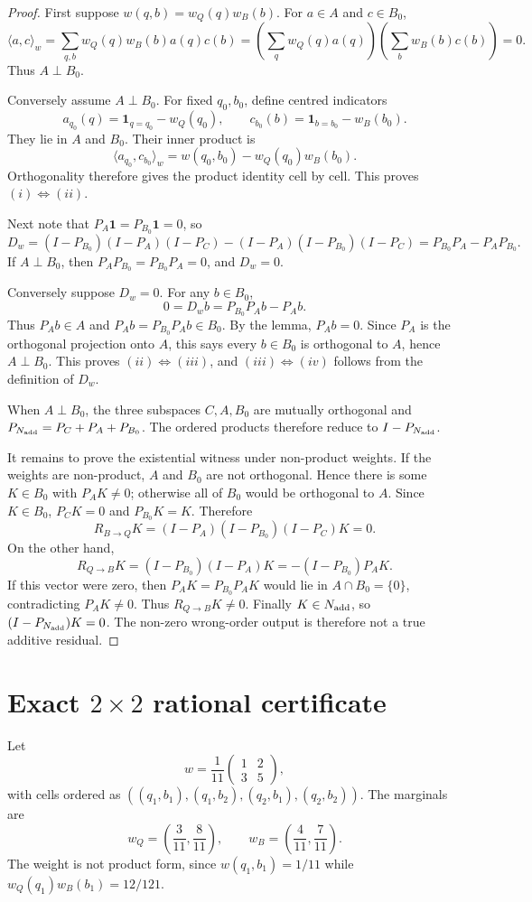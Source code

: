 \documentclass[11pt]{article}
\theoremstyle{remark}
\newcommand{\one}{\mathbf{1}}
\newcommand{\ip}[2]{\langle #1,#2\rangle_w}
\newcommand{\RQBt}{R_{Q\to B}}
\newcommand{\RBQt}{R_{B\to Q}}
\begin{document}
\begin{proof}
First suppose $w(q,b)=w_Q(q)w_B(b)$. For $a\in A$ and $c\in B_0$,
\[
\ip{a}{c}=\sum_{q,b}w_Q(q)w_B(b)a(q)c(b)
=\left(\sum_q w_Q(q)a(q)\right)
\left(\sum_b w_B(b)c(b)\right)=0.
\]
Thus $A\perp B_0$.

Conversely assume $A\perp B_0$. For fixed $q_0,b_0$, define centred indicators
\[
a_{q_0}(q)=\mathbf{1}_{q=q_0}-w_Q(q_0),\qquad
c_{b_0}(b)=\mathbf{1}_{b=b_0}-w_B(b_0).
\]
They lie in $A$ and $B_0$. Their inner product is
\[
\ip{a_{q_0}}{c_{b_0}}
=w(q_0,b_0)-w_Q(q_0)w_B(b_0).
\]
Orthogonality therefore gives the product identity cell by cell. This proves $(i)\Leftrightarrow(ii)$.

Next note that $P_A\one=P_{B_0}\one=0$, so
\[
D_w=(I-P_{B_0})(I-P_A)(I-P_C)-(I-P_A)(I-P_{B_0})(I-P_C)
=P_{B_0}P_A-P_AP_{B_0}.
\]
If $A\perp B_0$, then $P_AP_{B_0}=P_{B_0}P_A=0$, and $D_w=0$.

Conversely suppose $D_w=0$. For any $b\in B_0$,
\[
0=D_wb=P_{B_0}P_Ab-P_Ab.
\]
Thus $P_Ab\in A$ and $P_Ab=P_{B_0}P_Ab\in B_0$. By the lemma, $P_Ab=0$. Since $P_A$ is the orthogonal projection onto $A$, this says every $b\in B_0$ is orthogonal to $A$, hence $A\perp B_0$. This proves $(ii)\Leftrightarrow(iii)$, and $(iii)\Leftrightarrow(iv)$ follows from the definition of $D_w$.

When $A\perp B_0$, the three subspaces $C,A,B_0$ are mutually orthogonal and $P_{N_{\rm add}}=P_C+P_A+P_{B_0}$. The ordered products therefore reduce to $I-P_{N_{\rm add}}$.

It remains to prove the existential witness under non-product weights. If the weights are non-product, $A$ and $B_0$ are not orthogonal. Hence there is some $K\in B_0$ with $P_AK\ne0$; otherwise all of $B_0$ would be orthogonal to $A$. Since $K\in B_0$, $P_CK=0$ and $P_{B_0}K=K$. Therefore
\[
\RBQt K=(I-P_A)(I-P_{B_0})(I-P_C)K=0.
\]
On the other hand,
\[
\RQBt K=(I-P_{B_0})(I-P_A)K=-(I-P_{B_0})P_AK.
\]
If this vector were zero, then $P_AK=P_{B_0}P_AK$ would lie in $A\cap B_0=\{0\}$, contradicting $P_AK\ne0$. Thus $\RQBt K\ne0$. Finally $K\in N_{\rm add}$, so $(I-P_{N_{\rm add}})K=0$. The non-zero wrong-order output is therefore not a true additive residual.
\end{proof}

\section{Exact $2\times2$ rational certificate}

Let
\[
w=\frac1{11}\begin{pmatrix}1&2\\3&5\end{pmatrix},
\]
with cells ordered as $((q_1,b_1),(q_1,b_2),(q_2,b_1),(q_2,b_2))$. The marginals are
\[
w_Q=\left(\frac3{11},\frac8{11}\right),\qquad
w_B=\left(\frac4{11},\frac7{11}\right).
\]
The weight is not product form, since $w(q_1,b_1)=1/11$ while $w_Q(q_1)w_B(b_1)=12/121$.
\end{document}
